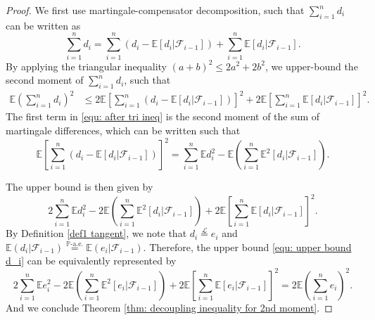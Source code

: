 \documentclass[ECP]{ejpecp} %
\newcommand{\F}{\mathcal{F}}
\newcommand{\G}{\mathcal{G}}
\newcommand{\lpar}{\left(}
\newcommand{\rpar}{\right)}
\newcommand{\lbr}{\left[}
\newcommand{\rbr}{\right]}
\newcommand{\pro}{\mathbb{P}}
\newcommand{\E}{\mathbb{E}}
\newcommand{\sumn}{\sum\limits_{i=1}^n}
\begin{document}
\begin{proof}
    We first use martingale-compensator decomposition, such that $\sumn d_i$ can be written as 
    \begin{equation}
        \label{equ: martingale-compensator decomposition}
        \sumn d_i = \sumn \lpar d_i-\E[d_i|\F_{i-1}]\rpar  +\sumn \E[d_i|\F_{i-1}].
    \end{equation}
    By applying the triangular inequality $(a+b)^2 \leq 2a^2+2b^2$, we upper-bound the second moment of $\sumn d_i$, such that
    \begin{align}
        \E \lpar \sumn d_i\rpar^2 & \leq 2 \E \lbr \sumn \lpar d_i-\E[d_i|\F_{i-1}]\rpar \rbr^2  + 2 \E \lbr \sumn \E[d_i|\F_{i-1}]\rbr^2 \label{equ: after tri ineq}.
    \end{align}
    The first term in \eqref{equ: after tri ineq} is the second moment of the sum of martingale differences, which can be written such that 
    \begin{equation}
        \label{equ: martingale difference}
        \E \lbr \sumn \lpar d_i-\E[d_i|\F_{i-1}]\rpar \rbr^2  =  \sumn  \E d^2_i - \E \lpar \sumn \E^2[d_i|\F_{i-1}]\rpar.
    \end{equation}

    The upper bound is then given by 
    \begin{equation}
    \label{equ: upper bound d_i}
        2 \sumn  \E d^2_i - 2\E \lpar \sumn \E^2[d_i|\F_{i-1}]\rpar  + 2 \E \lbr \sumn \E[d_i|\F_{i-1}]\rbr^2.
    \end{equation}
    By Definition \ref{def1 tangent}, we note that $d_i \stackrel{\mathcal L}{=} e_i$ and  $\E(d_i|\F_{i-1}) \stackrel{\pro\text{-a.e.}}{=} \E(e_i|\F_{i-1})$. Therefore, the upper bound \eqref{equ: upper bound d_i} can be equivalently represented by 
    \begin{equation}
        \label{equ: upper bound e_i}
        2 \sumn  \E e^2_i - 2\E \lpar \sumn \E^2[e_i|\F_{i-1}]\rpar  + 2 \E \lbr \sumn \E[e_i|\F_{i-1}]\rbr^2 = 2 \E \lpar \sumn e_i\rpar^2.
    \end{equation}
    And we conclude Theorem \ref{thm: decoupling inequality for 2nd moment}.
    
    

\end{proof}
\end{document}
